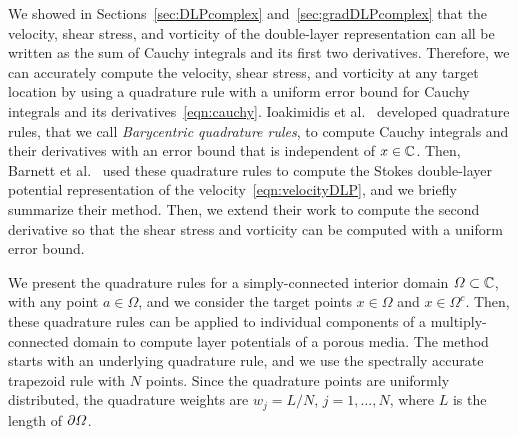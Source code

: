 \documentclass{jfm}
\begin{document}
We showed in Sections~\ref{sec:DLPcomplex} and~\ref{sec:gradDLPcomplex}
that the velocity, shear stress, and vorticity of the double-layer
representation can all be written as the sum of Cauchy integrals and its
first two derivatives.  Therefore, we can accurately compute the
velocity, shear stress, and vorticity at any target location by using a
quadrature rule with a uniform error bound for Cauchy integrals and its
derivatives~\eqref{eqn:cauchy}. Ioakimidis et al.~\citep{ioa-pap-per1991}
developed quadrature rules, that we call {\em Barycentric quadrature
rules}, to compute Cauchy integrals and their derivatives with an error
bound that is independent of $x \in {\mathbb{C}}$.  Then, Barnett et
al.~\citep{bar-wu-vee2015} used these quadrature rules to compute the
Stokes double-layer potential representation of the
velocity~\eqref{eqn:velocityDLP}, and we briefly summarize their method.
Then, we extend their work to compute the second derivative so that the
shear stress and vorticity can be computed with a uniform error bound. 

We present the quadrature rules for a simply-connected interior domain
$\varOmega \subset {\mathbb{C}}$, with any point $a \in \Omega$, and we consider the
target points $x \in \Omega$ and $x \in \Omega^c$. Then, these
quadrature rules can be applied to individual components of a
multiply-connected domain to compute layer potentials of a porous media.
The method starts with an underlying quadrature rule, and we use the
spectrally accurate trapezoid rule with $N$ points.  Since the
quadrature points are uniformly distributed, the quadrature weights are
$w_j = L/N$, $j=1,\ldots,N$, where $L$ is the length of ${\partial}\varOmega$.
\end{document}
